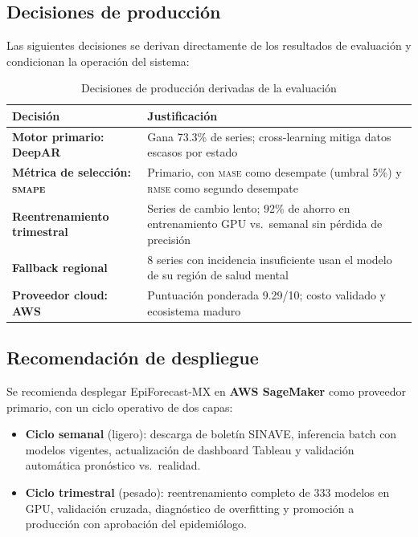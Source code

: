 \documentclass[12pt, letterpaper]{article}
\newcommand{\smape}{\textnormal{\textsc{smape}}}
\newcommand{\mase}{\textnormal{\textsc{mase}}}
\newcommand{\rmse}{\textnormal{\textsc{rmse}}}
\begin{document}
\newpage

\subsection{Decisiones de producción}

Las siguientes decisiones se derivan directamente de los resultados de evaluación y condicionan la operación del sistema:

\begin{table}[H]
\centering
\caption{Decisiones de producción derivadas de la evaluación}
\label{tab:decisiones_prod}
\small
\begin{tabularx}{\textwidth}{>{\bfseries}l X}
\toprule
\textbf{Decisión} & \textbf{Justificación} \\
\midrule
Motor primario: DeepAR & Gana 73.3\% de series; cross-learning mitiga datos escasos por estado \\
Métrica de selección: \smape{} & Primario, con \mase{} como desempate (umbral 5\%) y \rmse{} como segundo desempate \\
Reentrenamiento trimestral & Series de cambio lento; 92\% de ahorro en entrenamiento GPU vs.\ semanal sin pérdida de precisión \\
Fallback regional & 8 series con incidencia insuficiente usan el modelo de su región de salud mental \\
Proveedor cloud: AWS & Puntuación ponderada 9.29/10; costo validado y ecosistema maduro \\
\bottomrule
\end{tabularx}
\end{table}

\subsection{Recomendación de despliegue}

Se recomienda desplegar EpiForecast-MX en \textbf{AWS SageMaker} como proveedor primario, con un ciclo operativo de dos capas:

\begin{itemize}[noitemsep]
    \item \textbf{Ciclo semanal} (ligero): descarga de boletín SINAVE, inferencia batch con modelos vigentes, actualización de dashboard Tableau y validación automática pronóstico vs.\ realidad.
    \item \textbf{Ciclo trimestral} (pesado): reentrenamiento completo de 333 modelos en GPU, validación cruzada, diagnóstico de overfitting y promoción a producción con aprobación del epidemiólogo.
\end{itemize}
\end{document}
